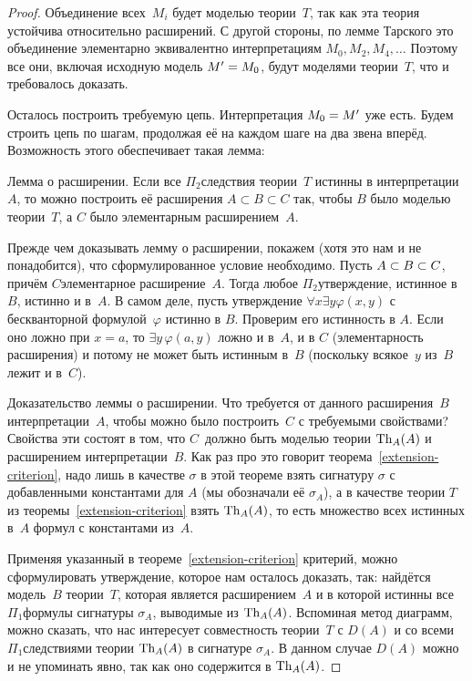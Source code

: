 \begin{proof}
Объединение всех~$M_i$ будет моделью теории~$T$, так как эта
теория устойчива относительно расширений. С другой стороны, по
лемме Тарского это объединение элементарно эквивалентно
интерпретациям $M_0,M_2,M_4,\dots$ Поэтому все они, включая
исходную модель $M'\hm=M_0$, будут моделями теории~$T$, что и
требовалось доказать.

Осталось построить требуемую цепь. Интерпретация $M_0\hm=M'$ уже
есть. Будем строить цепь по шагам, продолжая её на каждом шаге
на два звена вперёд. Возможность этого обеспечивает такая лемма:

\textsf{Лемма о расширении}.%
Если все $\Pi_2$\д следствия теории~$T$ истинны в интерпретации
$A$, то можно построить её расширения $A\subset B \subset C$ так,
чтобы $B$ было моделью теории~$T$, а $C$ было элементарным
расширением~$A$.

Прежде чем доказывать лемму о расширении, покажем (хотя это нам
и не понадобится), что сформулированное условие необходимо.
Пусть $A\hm\subset B\hm\subset C$, причём $C$\т элементарное
расширение~$A$. Тогда любое $\Pi_2$\д утверждение, истинное
в~$B$, истинно и в~$A$. В самом деле, пусть утверждение $\forall
x \exists y \varphi(x,y)$ с бескванторной формулой~$\varphi$
истинно в $B$. Проверим его истинность в $A$. Если оно ложно при
$x=a$, то $\exists y\,\varphi(a,y)$ ложно и в~$A$, и в $C$
(элементарность расширения) и потому не может быть истинным
в~$B$ (поскольку всякое~$y$ из~$B$ лежит и в~$C$).

Доказательство леммы о расширении. Что требуется от данного
расширения~$B$ интерпретации~$A$, чтобы можно было построить~$C$
с требуемыми свойствами? Свойства эти состоят в том, что
$C$~должно быть моделью теории $\operatorname{Th}_A(A)$ и расширением
интерпретации~$B$. Как раз про это говорит
теорема~\ref{extension-criterion}, надо лишь в качестве $\sigma$
в этой теореме взять сигнатуру $\sigma$ с добавленными
константами для $A$ (мы обозначали её $\sigma_A$), а в качестве
теории $T$ из теоремы~\ref{extension-criterion} взять
$\operatorname{Th}_A(A)$, то есть множество всех истинных в~$A$ формул с
константами из~$A$.

Применяя указанный в теореме~\ref{extension-criterion} критерий,
можно сформулировать утверждение, которое нам осталось доказать,
так: найдётся модель~$B$ теории~$T$, которая является
расширением~$A$ и в которой истинны все $\Pi_1$\д формулы
сигнатуры $\sigma_A$, выводимые из $\operatorname{Th}_A(A)$. Вспоминая метод
диаграмм, можно сказать, что нас интересует совместность
теории~$T$ с $D(A)$ и со всеми $\Pi_1$\д следствиями теории
$\operatorname{Th}_A(A)$ в сигнатуре $\sigma_A$. В данном случае $D(A)$ можно и
не упоминать явно, так как оно содержится в $\operatorname{Th}_A(A)$.


\end{proof}
